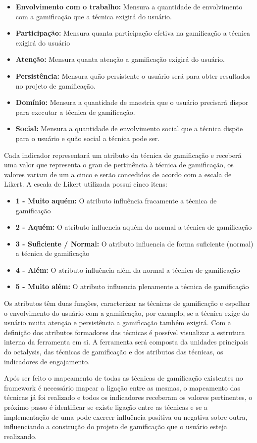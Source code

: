 \begin{itemize}
\item  \textbf {Envolvimento com o trabalho:}  Mensura a quantidade de envolvimento com a gamificação que a técnica exigirá do usuário.
\item  \textbf {Participação:}  Mensura quanta participação efetiva na gamificação a técnica exigirá do usuário
\item  \textbf {Atenção:}  Mensura quanta atenção a gamificação exigirá do usuário.
\item  \textbf {Persistência:} Mensura quão persistente o usuário será para obter resultados no projeto de gamificação. 
\item  \textbf {Domínio:} Mensura a quantidade de maestria que o usuário precisará dispor para executar a técnica de gamificação. 
\item  \textbf{Social:} Mensura a quantidade de envolvimento social que a técnica dispõe para o usuário e quão social a técnica pode ser.
\end{itemize}


Cada indicador representará um atributo da técnica de gamificação e receberá uma valor que representa o grau de pertinência à técnica de gamificação, os valores variam de um a cinco e serão concedidos de acordo com a escala de Likert. A escala de Likert  \cite{arruda200} utilizada possui cinco itens: 

\begin{itemize}
\item  \textbf {1 - Muito aquém:} O atributo influência fracamente a técnica de gamificação
\item  \textbf {2 - Aquém:} O atributo influencia aquém do normal a técnica de gamificação
\item  \textbf {3 - Suficiente / Normal:} O atributo influencia de forma suficiente (normal) a técnica de gamificação
\item  \textbf {4 - Além:} O atributo influência além da normal a técnica de gamificação
\item  \textbf {5 - Muito além:} O atributo influencia plenamente a técnica de gamificação
\end{itemize}


Os atributos têm duas funções, caracterizar as técnicas de gamificação e espelhar o envolvimento do usuário com a gamificação, por exemplo, se a técnica exige do usuário muita atenção e persistência a gamificação também exigirá. Com a definição dos atributos formadores das técnicas é possível visualizar a estrutura interna da ferramenta em si. A ferramenta será composta da unidades principais do octalysis, das técnicas de gamificação e dos atributos das técnicas, os indicadores de engajamento. 

Após ser feito o mapeamento de todas as técnicas de gamificação existentes no framework é necessário mapear a ligação entre as mesmas, o mapeamento das técnicas já foi realizado e todos os indicadores receberam os valores pertinentes, o próximo passo é identificar se existe ligação entre as técnicas e se a implementação de uma pode exercer influência positiva ou negativa sobre outra, influenciando a construção do projeto de gamificação que o usuário esteja realizando.


